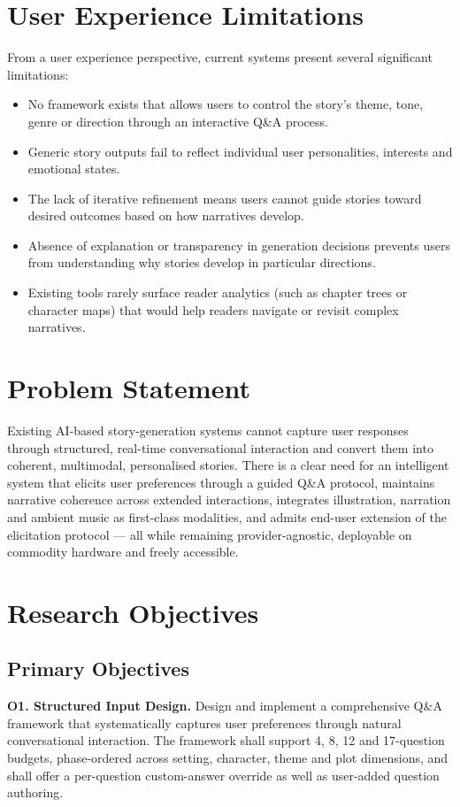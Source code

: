 \section{User Experience Limitations}
From a user experience perspective, current systems present several
significant limitations:

\begin{itemize}
    \item No framework exists that allows users to control the
    story's theme, tone, genre or direction through an interactive
    Q\&A process.
    \item Generic story outputs fail to reflect individual user
    personalities, interests and emotional states.
    \item The lack of iterative refinement means users cannot guide
    stories toward desired outcomes based on how narratives develop.
    \item Absence of explanation or transparency in generation
    decisions prevents users from understanding why stories develop
    in particular directions.
    \item Existing tools rarely surface reader analytics (such as
    chapter trees or character maps) that would help readers
    navigate or revisit complex narratives.
\end{itemize}

\section{Problem Statement}
Existing AI-based story-generation systems cannot capture user
responses through structured, real-time conversational interaction
and convert them into coherent, multimodal, personalised stories.
There is a clear need for an intelligent system that elicits user
preferences through a guided Q\&A protocol, maintains narrative
coherence across extended interactions, integrates illustration,
narration and ambient music as first-class modalities, and admits
end-user extension of the elicitation protocol --- all while
remaining provider-agnostic, deployable on commodity hardware and
freely accessible.

\section{Research Objectives}

\subsection{Primary Objectives}
\textbf{O1. Structured Input Design.} Design and implement a
comprehensive Q\&A framework that systematically captures user
preferences through natural conversational interaction. The framework
shall support 4, 8, 12 and 17-question budgets, phase-ordered across
setting, character, theme and plot dimensions, and shall offer a
per-question custom-answer override as well as user-added question
authoring.

